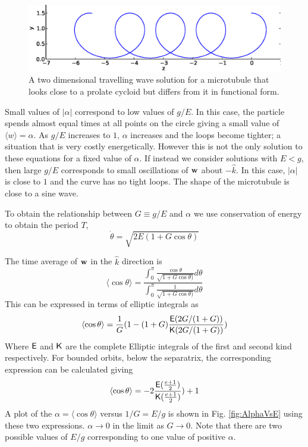 \documentclass[11pt]{ucthesis}
\def\bw{{\bf w}}
\begin{document}
{\begin{figure}[htp]
\begin{center}
\includegraphics[width=\hsize]{shape1.eps}
\caption{ 
A two dimensional travelling wave solution for a microtubule that looks close to a prolate cycloid but
differs from it in functional form.
}
\label{fig:prolate}
\end{center}
\end{figure}

Small values of $|\alpha|$ correspond to low values of $g/E$. In this case, the particle spends almost
equal times at all points on the circle giving a small value of $\langle w\rangle = \alpha$. As $g/E$
increases to $1$, $\alpha$ increases and the loops become tighter; a situation that is very costly energetically.
However this is not the only solution to these equations for a fixed value of $\alpha$. If instead we
consider solutions with $E < g$, then large $g/E$ corresponds to small oscillations of $\bw$ about $-{\hat k}$.
In this case, $|\alpha|$ is close to $1$ and the curve has no tight loops. The shape of the microtubule
is close to a sine wave.

To obtain the relationship between $G \equiv g/E$ and $\alpha$ we use conservation of energy
to obtain the period $T$,
\begin{equation}
\label{eq:pendulumenergy}
\dot{\theta} = \sqrt{2E(1+G\cos\theta)}
\end{equation}

The time average of $\bw$ in the $\hat k$ direction is
\begin{equation}
\label{eq:avependulumcostheta}
\langle \cos\theta\rangle = \frac{\int_0^\pi \frac{\cos\theta}{\sqrt{1+G\cos\theta)}} d\theta}{\int_0^\pi \frac{1}{\sqrt{1+G\cos\theta)}} d\theta}
\end{equation}
This can be expressed in terms of elliptic integrals as
\begin{equation}
\label{eq:avecosthetaElliptic}
\langle \cos\theta\rangle =  \frac{1}{G} (1- (1+G) \frac{{\sf E}(2G/(1+G))}{{\sf K}(2G/(1+G))})
\end{equation}
Where  $\sf E$ and $\sf K$ are the complete Elliptic integrals of the first and second kind respectively.
For bounded orbits, below the separatrix, the corresponding expression can be calculated giving
\begin{equation}
\label{eq:avecosthetaEllipticBounded}
\langle \cos\theta\rangle =  -2 \frac{{\sf E}(\frac{e+1}{2})}{{\sf K} (\frac{e+1}{2}) }) + 1
\end{equation}
A plot of the $\alpha = \langle \cos\theta\rangle$ versus $1/G = E/g$ is shown in Fig. \ref{fig:AlphaVsE}
using these two expressions.
$\alpha \rightarrow 0$ in the limit as $G \rightarrow 0$. Note that there are two possible values of
$E/g$ corresponding to one value of positive $\alpha$.

}
\end{document}
